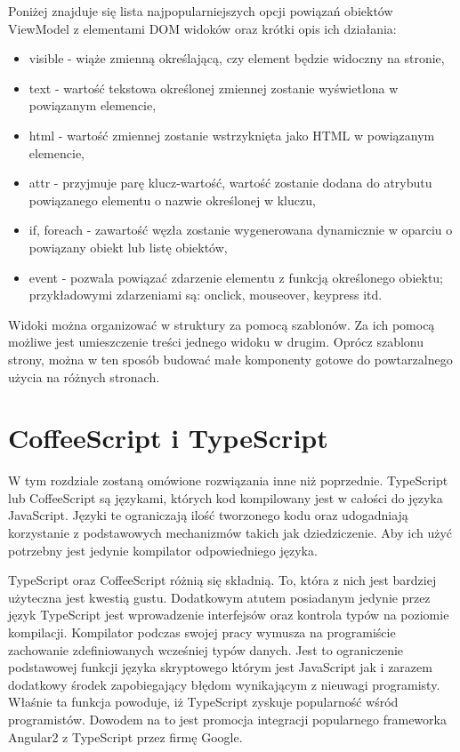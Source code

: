Poniżej znajduje się lista najpopularniejszych opcji powiązań obiektów ViewModel z elementami DOM widoków oraz krótki opis ich działania:

\begin{itemize}
\item visible - wiąże zmienną określającą, czy element będzie widoczny na stronie,
\item text - wartość tekstowa określonej zmiennej zostanie wyświetlona w powiązanym elemencie,
\item html - wartość zmiennej zostanie wstrzyknięta jako HTML w powiązanym elemencie,
\item attr - przyjmuje parę klucz-wartość, wartość zostanie dodana do atrybutu powiązanego elementu o nazwie określonej w kluczu,
\item if, foreach - zawartość węzła zostanie wygenerowana dynamicznie w oparciu o powiązany obiekt lub listę obiektów,
\item event - pozwala powiązać zdarzenie elementu z funkcją określonego obiektu; przykładowymi zdarzeniami są: onclick, mouseover, keypress itd.
\end{itemize}

Widoki można organizować w struktury za pomocą szablonów. Za ich pomocą możliwe jest umieszczenie treści jednego widoku w drugim. Oprócz szablonu strony, można w ten sposób budować małe komponenty gotowe do powtarzalnego użycia na różnych stronach.


\section{CoffeeScript i TypeScript}
W tym rozdziale zostaną omówione rozwiązania inne niż poprzednie. TypeScript lub CoffeeScript są językami, których kod kompilowany jest w całości do języka JavaScript\cite{typescript-book,}. Języki te ograniczają ilość tworzonego kodu oraz udogadniają korzystanie z podstawowych mechanizmów takich jak dziedziczenie. Aby ich użyć potrzebny jest jedynie kompilator odpowiedniego języka.

TypeScript oraz CoffeeScript różnią się składnią. To, która z nich jest bardziej użyteczna jest kwestią gustu. Dodatkowym atutem posiadanym jedynie przez język TypeScript jest wprowadzenie interfejsów oraz kontrola typów na poziomie kompilacji. Kompilator podczas swojej pracy wymusza na programiście zachowanie zdefiniowanych wcześniej typów danych. Jest to ograniczenie podstawowej funkcji języka skryptowego którym jest JavaScript jak i zarazem dodatkowy środek zapobiegający błędom wynikającym z nieuwagi programisty. Właśnie ta funkcja powoduje, iż TypeScript zyskuje popularność wśród programistów. Dowodem na to jest promocja integracji popularnego frameworka Angular2 z TypeScript przez firmę Google\cite{angular2-site}.

